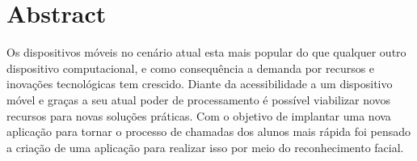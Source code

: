\section{Abstract}\label{sec:abstract}

Os dispositivos móveis no cenário atual esta mais popular do que qualquer outro dispositivo computacional, e como consequência a demanda por recursos e inovações tecnológicas tem crescido.
Diante da acessibilidade a um dispositivo móvel e graças a seu atual poder de processamento é possível viabilizar novos recursos para novas soluções práticas.
Com o objetivo de implantar uma nova aplicação para tornar o processo de chamadas dos alunos mais rápida foi pensado a criação de uma aplicação para realizar isso por meio do reconhecimento facial. 
